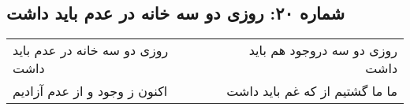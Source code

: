 \begin{center}
\section*{شماره ۲۰: روزی دو سه خانه در عدم باید داشت}
\label{sec:020}
\begin{longtable}{l p{0.5cm} r}
روزی دو سه خانه در عدم باید داشت
&&
روزی دو سه دروجود هم باید داشت
\\
اکنون ز وجود و از عدم آزادیم
&&
ما ما گشتیم از که غم باید داشت
\\
\end{longtable}
\end{center}
